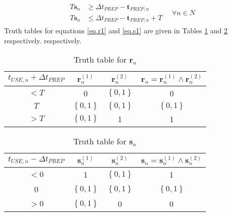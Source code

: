 \begin{equation}
    \begin{split}
        \begin{alignedat}{2}
            T \boldsymbol{s}_{n} &\ge \Delta t_{\mathit{PREP}}
            - \boldsymbol{t}_{\mathit{PREP},n}\\
            T \boldsymbol{s}_{n} &\le \Delta t_{\mathit{PREP}} 
            -\boldsymbol{t}_{\mathit{PREP},n} + T
        \end{alignedat}
        \quad \forall n \in N
    \end{split}
    \label{eq.s1}
\end{equation}
Truth tables for equations \ref{eq.r1} and \ref{eq.s1} are given in Tables
\ref{tbl.truthr} and \ref{tbl.truths} respectively.
respectively.
\begin{table}[h!]
    \centering
    \caption{Truth table for $\boldsymbol{r}_{n}$}
    \label{tbl.truthr}
    \begin{tabular}{c | c c | c}
        $t_{\mathit{USE},n} + \Delta t_{\mathit{PREP}}$
        & $\boldsymbol{r}_{n}^{\left( 1 \right)}$
        & $\boldsymbol{r}_{n}^{\left( 2 \right)}$
        & $\boldsymbol{r}_{n} = \boldsymbol{r}_{n}^{\left( 1 \right)} \land
        \boldsymbol{r}_{n}^{\left( 2 \right)}$\\ \hline
        $< T$ & 0 & $\left\{ 0,1 \right\}$ & 0\\
        $T$ & $\left\{ 0,1 \right\}$ & $\left\{ 0,1 \right\}$
            & $\left\{ 0,1 \right\}$\\
        $>T$ & $\left\{ 0,1 \right\}$ & 1 & 1\\
    \end{tabular}
\end{table}
\begin{table}[h!]
    \centering
    \caption{Truth table for $\boldsymbol{s}_{n}$}
    \label{tbl.truths}
    \begin{tabular}{c | c c | c}
        $t_{\mathit{USE},n} - \Delta t_{\mathit{PREP}}$
        & $\boldsymbol{s}_{n}^{\left( 1 \right)}$
        & $\boldsymbol{s}_{n}^{\left( 2 \right)}$
        & $\boldsymbol{s}_{n} = \boldsymbol{s}_{n}^{\left( 1 \right)} \land
        \boldsymbol{s}_{n}^{\left( 2 \right)}$\\ \hline
        $< 0$ & 1 & $\left\{ 0,1 \right\}$ & 1\\
        0 & $\left\{ 0,1 \right\}$ & $\left\{ 0,1 \right\}$
            & $\left\{ 0,1 \right\}$\\
        $> 0$ & $\left\{ 0,1 \right\}$ & 0 & 0\\
    \end{tabular}
\end{table}

